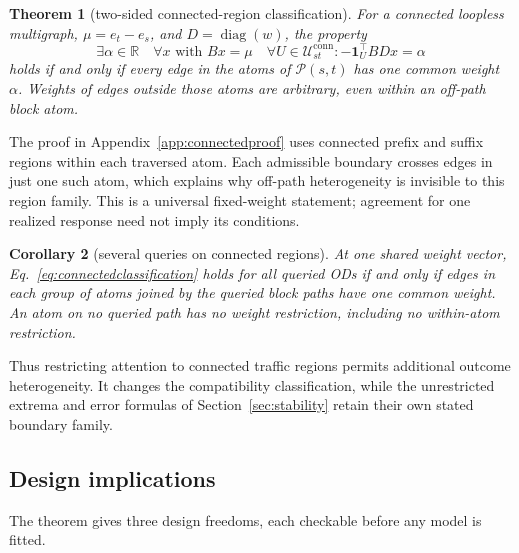 \documentclass[a4paper,fleqn]{cas-sc}
\newtheorem{theorem}{Theorem}
\newtheorem{corollary}[theorem]{Corollary}
\newcommand{\R}{\mathbb{R}}
\begin{document}
\medskip
\noindent{}
\medskip

\begin{theorem}[two-sided connected-region classification]\label{thm:connectedclassification}
For a connected loopless multigraph, $\mu=e_t-e_s$, and
$D=\operatorname{diag}(w)$, the property
\begin{equation}
\exists\alpha\in\R\quad\forall x\text{ with }Bx=\mu\quad
\forall U\in\mathcal U^{\mathrm{conn}}_{st}:
-\mathbf1_U^\top BDx=\alpha
\label{eq:connectedclassification}
\end{equation}
holds if and only if every edge in the atoms of $\mathcal P(s,t)$ has
one common weight $\alpha$. Weights of edges outside those atoms are
arbitrary, even within an off-path block atom.
\end{theorem}
The proof in Appendix~\ref{app:connectedproof} uses connected prefix and
suffix regions within each traversed atom. Each admissible boundary
crosses edges in just one such atom, which explains why off-path
heterogeneity is invisible to this region family. This is a universal
fixed-weight statement; agreement for one realized response need not
imply its conditions.

\begin{corollary}[several queries on connected regions]\label{cor:connectedmulti}
At one shared weight vector, Eq.~\eqref{eq:connectedclassification} holds
for all queried ODs if and only if edges in each group of atoms joined
by the queried block paths have one common weight. An atom on no queried
path has no weight restriction, including no within-atom restriction.
\end{corollary}
Thus restricting attention to connected traffic regions permits additional
outcome heterogeneity. It changes the compatibility classification,
while the unrestricted extrema and error formulas of
Section~\ref{sec:stability} retain their own stated boundary family.

\subsection{Design implications}\label{sec:design}
The theorem gives three design freedoms, each checkable before any model
is fitted.
\end{document}
